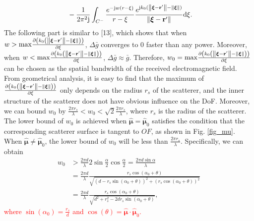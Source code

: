 \documentclass[a4paper,12pt]{article}
\begin{document}
\begin{framed}
{\begin{equation}
\begin{aligned}
            \\& ~~~~- \frac{1}{2\pi^2{\rm j}} \int_{C^-} \frac{e^{ -{\rm j}w(r-\xi)}}{r-\xi}\frac{e^{{\rm j}k_0(\left\| \boldsymbol{\xi}-{\bf r}' \right\|-\left\| \boldsymbol{\xi} \right\|)}}{\left\| \boldsymbol{\xi}-{\bf r}' \right\|}{\rm d}\xi. 
        \end{aligned}
    \end{equation}
    The following part is similar to [13], which shows that when $w>{\rm max}\frac{\partial \left( k_0\left( \left\| \boldsymbol{\xi}-{\bf r}' \right\|-\left\| \boldsymbol{\xi} \right\| \right) \right)}{\partial \xi}$, $\Delta \bar{g}$ converges to 0 faster than any power. Moreover, when $w<{\rm max}\frac{\partial \left( k_0\left( \left\| \boldsymbol{\xi}-{\bf r}' \right\|-\left\| \boldsymbol{\xi} \right\| \right) \right)}{\partial \xi}$, $\Delta \bar{g}\approx \bar{g}$. Therefore, $w_0 = {\rm max}\frac{\partial \left( k_0\left( \left\| \boldsymbol{\xi}-{\bf r}' \right\|-\left\| \boldsymbol{\xi} \right\| \right) \right)}{\partial \xi}$ can be chosen as the spatial bandwidth of the received electromagnetic field. From geometrical analysis, it is easy to find that the maximum of $\frac{\partial \left( k_0\left( \left\| \boldsymbol{\xi}-{\bf r}' \right\|-\left\| \boldsymbol{\xi} \right\| \right) \right)}{\partial \xi}$ only depends on the radius $r_s$ of the scatterer, and the inner structure of the scatterer does not have obvious influence on the DoF. Moreover, we can bound $w_0$ by $\frac{2\pi r_s}{\lambda}<w_0<\sqrt{2}\frac{2\pi r_s}{\lambda}$, where $r_s$ is the radius of the scatterer. The lower bound of $w_0$ is achieved when $\boldsymbol{\hat{\mu}} = \boldsymbol{\hat{\mu}}_0$ satisfies the condition that the corresponding scatterer surface is tangent to $OF$, as shown in Fig. \ref{fig_mu}. When $\boldsymbol{\hat{\mu}} \neq \boldsymbol{\hat{\mu}}_0$, the lower bound of $w_0$ will be less than $\frac{2\pi r_s}{\lambda}$. Specifically, we can obtain 
\begin{equation}
	\begin{aligned}
		w_0&>\frac{2\pi d }{\lambda} 2\sin \frac{\alpha}{2} \cos \frac{\alpha}{2} = \frac{2\pi d \sin \alpha}{\lambda}
		\\& = \frac{2\pi d}{\lambda} \frac{r_s \cos(\alpha_0+\theta)}{\sqrt{(d-r_s\sin(\alpha_0+\theta))^2+(r_s\cos(\alpha_0+\theta))^2}}
		\\& = \frac{2\pi d}{\lambda}\frac{r_s\cos(\alpha_0+\theta)}{\sqrt{d^2+r_s^2-2dr_s\sin(\alpha_0+\theta)}},
	\end{aligned}
\end{equation}
}{\textcolor{red}{
where $\sin(\alpha_0)=\frac{r_s}{d}$ and $\cos(\theta) = \boldsymbol{\hat{\mu}}\cdot\boldsymbol{\hat{\mu}}_0 $.}
}


\end{framed}
\end{document}
